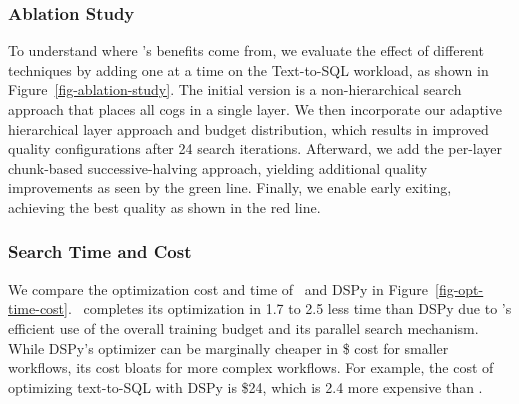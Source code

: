 \subsubsection{Ablation Study}
To understand where \sysname's benefits come from, we evaluate the effect of different techniques by adding one at a time on the Text-to-SQL workload, as shown in Figure~\ref{fig-ablation-study}. %
The initial version is a non-hierarchical search approach that places all cogs in a single layer.
We then incorporate our adaptive hierarchical layer approach and budget distribution, which results in improved quality configurations after 24 search iterations.
Afterward, we add the per-layer chunk-based successive-halving approach, yielding additional quality improvements as seen by the green line.
Finally, we enable early exiting, achieving the best quality as shown in the red line.

\subsubsection{Search Time and Cost}

We compare the optimization cost and time of \sysname\ and DSPy in Figure~\ref{fig-opt-time-cost}. %
\sysname\ completes its optimization in 1.7\x{} to 2.5\x{} less time than DSPy due to \sysname's efficient use of the overall training budget and its parallel search mechanism. %
While DSPy's optimizer can be marginally cheaper in \$ cost for smaller workflows, its cost bloats for more complex workflows. For example, the cost of optimizing text-to-SQL with DSPy is \$24, which is 2.4\x{} more expensive than \sysname.



%

% 
